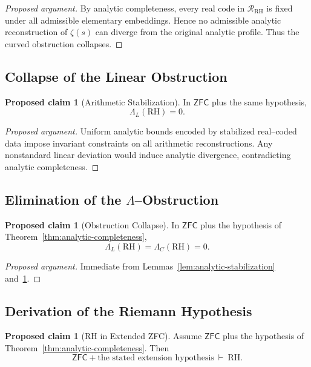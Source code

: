 \documentclass{article}
\theoremstyle{definition}
\newtheorem{proposal}[theorem]{Proposed claim}
\begin{document}
\begin{proof}[Proposed argument]
By analytic completeness, every real code in $\mathcal{R}_{\mathrm{RH}}$ is fixed
under all admissible elementary embeddings. Hence no admissible analytic
reconstruction of $\zeta(s)$ can diverge from the original analytic profile.
Thus the curved obstruction collapses.
\end{proof}

\subsection{Collapse of the Linear Obstruction}

\begin{proposal}[Arithmetic Stabilization]
\label{lem:linear-stabilization}
In $\mathsf{ZFC}$ plus the same hypothesis,
\[
\Lambda_L(\mathrm{RH}) = 0.
\]
\end{proposal}

\begin{proof}[Proposed argument]
Uniform analytic bounds encoded by stabilized real--coded data impose invariant
constraints on all arithmetic reconstructions. Any nonstandard linear deviation
would induce analytic divergence, contradicting analytic completeness.
\end{proof}

\subsection{Elimination of the \texorpdfstring{$\Lambda$}{Lambda}--Obstruction}

\begin{proposal}[Obstruction Collapse]
\label{thm:obstruction-collapse}
In $\mathsf{ZFC}$ plus the hypothesis of
Theorem~\ref{thm:analytic-completeness},
\[
\Lambda_L(\mathrm{RH}) = \Lambda_C(\mathrm{RH}) = 0.
\]
\end{proposal}

\begin{proof}[Proposed argument]
Immediate from Lemmas~\ref{lem:analytic-stabilization}
and~\ref{lem:linear-stabilization}.
\end{proof}

\subsection{Derivation of the Riemann Hypothesis}

\begin{proposal}[RH in Extended ZFC]
\label{thm:RH-extended-ZFC}
Assume $\mathsf{ZFC}$ plus the hypothesis of
Theorem~\ref{thm:analytic-completeness}. Then
\[
\mathsf{ZFC}+\text{the stated extension hypothesis}\ \vdash\ \mathrm{RH}.
\]
\end{proposal}
\end{document}
